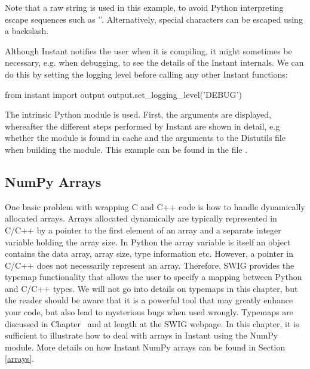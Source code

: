 Note that a raw string is used in this example, to avoid
Python interpreting escape sequences such as '\verb@\@{}'. Alternatively,
special characters can be escaped using a backslash.

Although Instant notifies the user when it is compiling, it might
sometimes be necessary, e.g. when debugging, to see the details of the Instant
internals. We can do this by setting the logging level before calling any
other Instant functions:
\begin{code}
from instant import output
output.set_logging_level('DEBUG')
\end{code} 
The intrinsic Python module  is used. First, the 
 arguments are displayed, whereafter the different steps
performed by Instant are shown in detail, e.g whether the module is found in
cache and the arguments to the Distutils file when building the module. 
This example can be found in the file .


\subsection{NumPy Arrays}
One basic problem with wrapping C and C++ code is how to handle dynamically
allocated arrays. Arrays allocated
dynamically are typically represented in C/C++ by a pointer to the first element
of an array and a separate integer variable holding the array size. In Python
the array variable is itself an object contains the data array, array size, 
type information etc. However, a pointer in C/C++ does not necessarily
represent an array. Therefore, SWIG provides the typemap functionality 
that allows the user to specify a mapping between Python and C/C++ types. We
will not go into details on typemaps in this chapter, but the reader 
should be aware that it is a powerful tool that may greatly enhance your 
code, but also lead to mysterious bugs when used wrongly. Typemaps 
are discussed in Chapter~\cite{mixedlanguage} and at length at the SWIG
webpage. In this chapter, it is sufficient to illustrate how to deal
with arrays in Instant using the NumPy module. More details on how Instant
NumPy arrays can be found in Section \ref{arrays}.

